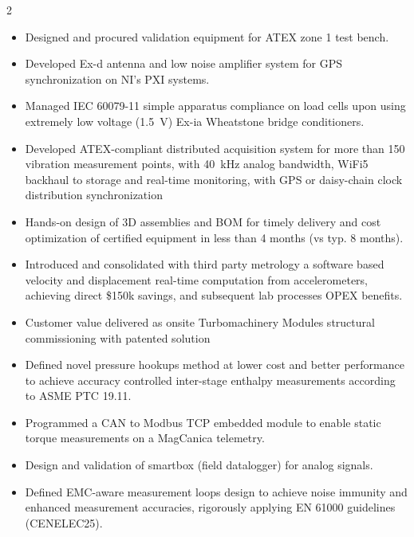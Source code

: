 \documentclass[9pt,a4paper,ragged2e,withhyper]{altacv} %
\begin{document}
\begin{paracol}{2}
\begin{itemize}
\item Designed and procured validation equipment for ATEX zone 1 test bench.
\item Developed Ex-d antenna and low noise amplifier system for GPS synchronization on NI's PXI systems.
\item Managed IEC 60079-11 simple apparatus compliance on load cells upon using extremely low voltage (1.5~V) Ex-ia Wheatstone bridge conditioners.
\end{itemize}
\divider

\begin{itemize}
\item Developed ATEX-compliant distributed acquisition system for more than 150 vibration measurement points, with 40~kHz analog bandwidth, WiFi5 backhaul to storage and real-time monitoring, with GPS or daisy-chain clock distribution synchronization
\item Hands-on design of 3D assemblies and BOM for timely delivery and cost optimization of certified equipment in less than 4 months (vs typ. 8 months).
\item Introduced and consolidated with third party metrology a software based velocity and displacement real-time computation from accelerometers, achieving direct \$150k savings, and subsequent lab processes OPEX benefits.
\item Customer value delivered as onsite Turbomachinery Modules structural commissioning with patented solution
\end{itemize}
\divider

\begin{itemize}
\item Defined novel pressure hookups method at lower cost and better performance to achieve accuracy controlled inter-stage enthalpy measurements according to ASME PTC 19.11.
\item Programmed a CAN to Modbus TCP embedded module to enable static torque measurements on a MagCanica telemetry.
\end{itemize}
\divider

\begin{itemize}
\item Design and validation of smartbox (field datalogger) for analog signals.
\item Defined EMC-aware measurement loops design to achieve noise immunity and enhanced measurement accuracies, rigorously applying EN 61000 guidelines (CENELEC25).
\end{itemize}
\divider


\end{paracol}
\end{document}
